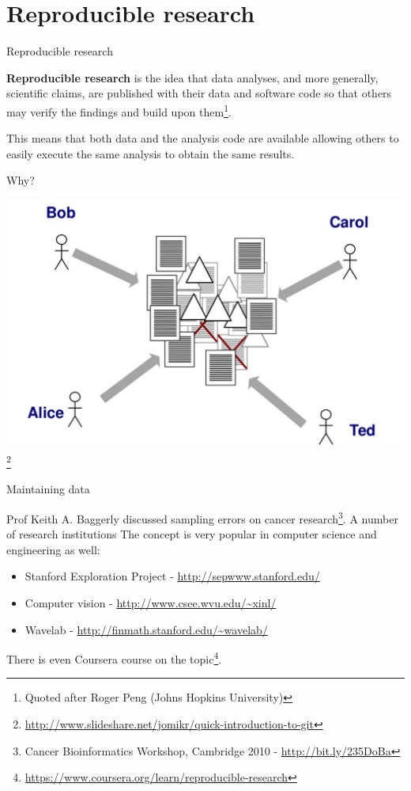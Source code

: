 \documentclass[11pt]{beamer}
\begin{document}
\section{Reproducible research}

\begin{frame}[fragile]{Reproducible research}

\textbf{Reproducible research} is the idea that data analyses, and more generally, scientific claims, are published with their data and software code so that others may verify the findings and build upon them\footnote[frame]{Quoted after Roger Peng (Johns Hopkins University)}.

\bigskip
This means that both data and the analysis code are available allowing others to easily execute the same analysis to obtain the same results.

\end{frame}


\begin{frame}{Why?}%

\centering
\includegraphics[width=\textwidth]{pic/disaster.jpg}\footnote{\url{http://www.slideshare.net/jomikr/quick-introduction-to-git}}

\end{frame}


\begin{frame}[fragile]{Maintaining data}

Prof Keith A. Baggerly discussed sampling errors on cancer research\footnote{Cancer Bioinformatics Workshop, Cambridge 2010 - \url{http://bit.ly/235DoBa}}. A number of research institutions The concept is very popular in computer science and engineering as well:

\begin{itemize}
	\item Stanford Exploration Project - \url{http://sepwww.stanford.edu/}
	\item Computer vision - \url{http://www.csee.wvu.edu/~xinl/}
	\item Wavelab - \url{http://finmath.stanford.edu/~wavelab/}
\end{itemize}

There is even Coursera course on the topic\footnote{\url{https://www.coursera.org/learn/reproducible-research}}.

\end{frame}
\end{document}
